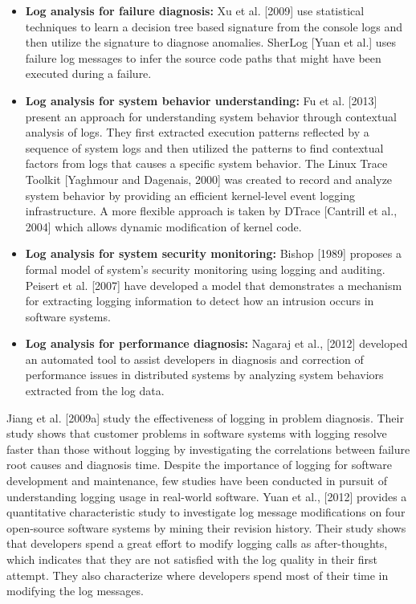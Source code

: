 \begin{itemize} [leftmargin=0.7in]
\item \textbf{Log analysis for failure diagnosis: }Xu et al. [2009] use statistical techniques to learn a decision tree based signature from the console logs and then utilize the signature to diagnose anomalies. SherLog [Yuan et al.] uses failure log messages to infer the source code paths that might have been executed during a failure.
\item \textbf{Log analysis for system behavior understanding: }Fu et al. [2013] present an approach for understanding system behavior through contextual analysis of logs. They first extracted execution patterns reflected by a sequence of system logs and then utilized the patterns to find contextual factors from logs that causes a specific system behavior. The Linux Trace Toolkit [Yaghmour and Dagenais, 2000] was created to record and analyze system behavior by providing an efficient kernel-level event logging infrastructure. A more flexible approach is taken by DTrace [Cantrill et al., 2004] which allows dynamic modification of kernel code.
\item \textbf{Log analysis for system security monitoring: }Bishop [1989] proposes a formal model of system’s security monitoring using logging and auditing. Peisert et al. [2007] have developed a model that demonstrates a mechanism for extracting logging information to detect how an intrusion occurs in software systems.%
\item \textbf{Log analysis for performance diagnosis: }Nagaraj et al., [2012] developed an automated tool to assist developers in diagnosis and correction of performance issues in distributed systems by analyzing system behaviors extracted from the log data.
\end{itemize}
 
Jiang et al. [2009a] study the effectiveness of logging in problem diagnosis. Their study shows that customer problems in software systems with logging resolve faster than those without logging by investigating the correlations between failure root causes and diagnosis time. Despite the importance of logging for software development and maintenance, few studies have been conducted in pursuit of understanding logging usage in real-world software. Yuan et al., [2012] provides a quantitative characteristic study to investigate log message modifications on four open-source software systems by mining their revision history. Their study shows that developers spend a great effort to modify logging calls as after-thoughts, which indicates that they are not satisfied with the log quality in their first attempt. They also characterize where developers spend most of their time in modifying the log messages. 

